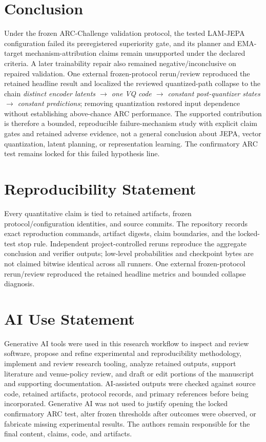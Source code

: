 \documentclass[twoside]{article}
\begin{document}
\section{Conclusion}
Under the frozen ARC-Challenge validation protocol, the tested LAM-JEPA configuration failed its preregistered superiority gate, and its planner and EMA-target mechanism-attribution claims remain unsupported under the declared criteria. A later trainability repair also remained negative/inconclusive on repaired validation. One external frozen-protocol rerun/review reproduced the retained headline result and localized the reviewed quantized-path collapse to the chain \emph{distinct encoder latents $\rightarrow$ one VQ code $\rightarrow$ constant post-quantizer states $\rightarrow$ constant predictions}; removing quantization restored input dependence without establishing above-chance ARC performance. The supported contribution is therefore a bounded, reproducible failure-mechanism study with explicit claim gates and retained adverse evidence, not a general conclusion about JEPA, vector quantization, latent planning, or representation learning. The confirmatory ARC test remains locked for this failed hypothesis line.

\section*{Reproducibility Statement}
Every quantitative claim is tied to retained artifacts, frozen protocol/configuration identities, and source commits. The repository records exact reproduction commands, artifact digests, claim boundaries, and the locked-test stop rule. Independent project-controlled reruns reproduce the aggregate conclusion and verifier outputs; low-level probabilities and checkpoint bytes are not claimed bitwise identical across all runners. One external frozen-protocol rerun/review reproduced the retained headline metrics and bounded collapse diagnosis.

\section*{AI Use Statement}
Generative AI tools were used in this research workflow to inspect and review software, propose and refine experimental and reproducibility methodology, implement and review research tooling, analyze retained outputs, support literature and venue-policy review, and draft or edit portions of the manuscript and supporting documentation. AI-assisted outputs were checked against source code, retained artifacts, protocol records, and primary references before being incorporated. Generative AI was not used to justify opening the locked confirmatory ARC test, alter frozen thresholds after outcomes were observed, or fabricate missing experimental results. The authors remain responsible for the final content, claims, code, and artifacts.




\end{document}
